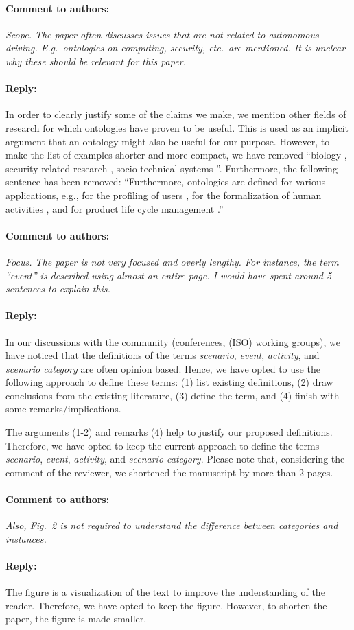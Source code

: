 \documentclass[10pt,final,a4paper,oneside,onecolumn]{article}
\newcommand{\toauthor}{\paragraph*{Comment to authors:} \itshape}
\newcommand{\fromauthor}{\paragraph*{Reply:} \normalfont}
\begin{document}
\toauthor Scope. The paper often discusses issues that are not related to autonomous driving. E.g.\ ontologies on computing, security, etc.\ are mentioned. It is unclear why these should be relevant for this paper.

\fromauthor In order to clearly justify some of the claims we make, we mention other fields of research for which ontologies have proven to be useful. This is used as an implicit argument that an ontology might also be useful for our purpose. However, to make the list of examples shorter and more compact, we have removed ``biology \autocite{gkoutos2004mouse}, security-related research \autocite{kim2005security}, socio-technical systems \autocite{vanDamPhDThesis2009}''. Furthermore, the following sentence has been removed: ``Furthermore, ontologies are defined for various applications, e.g., for the profiling of users \autocite{golemati2007creating}, for the formalization of human activities \autocite{lee2017location}, and for product life cycle management \autocite{matsokis2010plm}.''



\toauthor Focus. The paper is not very focused and overly lengthy. For instance, the term ``event'' is described using almost an entire page. I would have spent around 5 sentences to explain this.  

\fromauthor  In our discussions with the community (conferences, (ISO) working groups), we have noticed that the definitions of the terms \emph{scenario}, \emph{event}, \emph{activity}, and \emph{scenario category} are often opinion based. Hence, we have opted to use the following approach to define these terms: (1) list existing definitions, (2) draw conclusions from the existing literature, (3) define the term, and (4) finish with some remarks/implications. 

The arguments (1-2) and remarks (4) help to justify our proposed definitions. 
Therefore, we have opted to keep the current approach to define the terms \emph{scenario}, \emph{event}, \emph{activity}, and \emph{scenario category}. Please note that, considering the comment of the reviewer, we shortened the manuscript by more than 2 pages.



\toauthor Also, Fig.~2 is not required to understand the difference between categories and instances. 

\fromauthor The figure is a visualization of the text to improve the understanding of the reader. Therefore, we have opted to keep the figure. However, to shorten the paper, the figure is made smaller.
\end{document}
